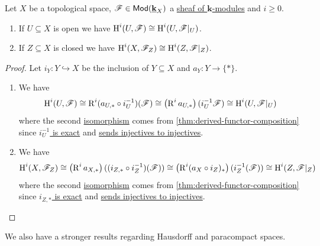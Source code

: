 \documentclass[../../main]{subfiles}
\begin{document}
\begin{proposition}\label{prop:cohomology-subsets}
  Let \(X\) be a topological space, \(\mathscr{F} \in \mathsf{Mod}(\underline{\mathbf{k}}_{X})\) a \hyperref[def:sheaf]{sheaf of \(\mathbf{k}\)-modules} and \(i \geq 0\).
  \begin{enumerate}
    \item If \(U \subseteq X\) is open we have \(\operatorname{H}^{i}(U, \mathscr{F}) \cong \operatorname{H}^{i}(U, \mathscr{F}|_{U})\).
    \item If \(Z \subseteq X\) is closed we have \(\operatorname{H}^{i}(X, \mathscr{F}_{Z}) \cong \operatorname{H}^{i}(Z, \mathscr{F}|_{Z})\).
  \end{enumerate}
\end{proposition}
\begin{proof}
  Let \(i_{Y}\colon Y \hookrightarrow X\) be the inclusion of \(Y \subseteq X\) and \(a_{Y}\colon Y \to \{\ast\}\).
  \begin{enumerate}
    \item We have
          \begin{equation*}
            \operatorname{H}^{i}(U, \mathscr{F}) \cong \operatorname{R}^{i}(a_{U, \ast} \circ i_{U}^{-1})(\mathscr{F}) \cong \left(\operatorname{R}^{i} a_{U, \ast} \right)(i_{U}^{-1}\mathscr{F}) \cong \operatorname{H}^{i}(U, \mathscr{F}|_{U})
          \end{equation*}
          where the second \hyperref[def:categorical-isomorphism]{isomorphism} comes from \autoref{thm:derived-functor-composition} since \hyperref[cor:inverse-image-sheaf-exact]{\(i_{U}^{-1}\) is exact} and \hyperref[lemma:injective-sheaves-and-maps]{sends injectives to injectives}.
    \item We have
          \begin{equation*}
            \operatorname{H}^{i}(X, \mathscr{F}_{Z}) \cong \left( \operatorname{R}^{i}a_{X, \ast} \right)(( i_{Z, \ast} \circ i_{Z}^{-1}) (\mathscr{F})) \cong \left( \operatorname{R}^{i} (a_{X} \circ i_{Z})_{\ast} \right) (i_{Z}^{-1}(\mathscr{F})) \cong \operatorname{H}^{i}(Z, \mathscr{F}|_{Z})
          \end{equation*}
          where the second \hyperref[def:categorical-isomorphism]{isomorphism} comes from \autoref{thm:derived-functor-composition} since \hyperref[cor:closed-immersion-exact]{\(i_{Z, \ast}\) is exact} and \hyperref[lemma:injective-sheaves-and-maps]{sends injectives to injectives}. \qedhere
  \end{enumerate}
\end{proof}

We also have a stronger results regarding Hausdorff and paracompact spaces.
\end{document}
